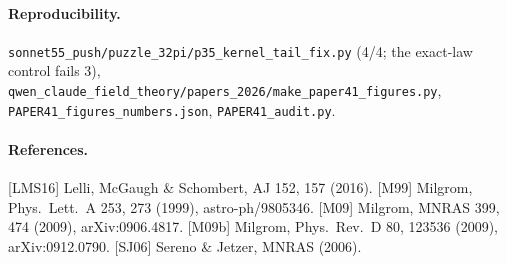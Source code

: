 \documentclass[10pt]{article}
\newcommand{\fpath}[1]{\nolinkurl{#1}}
\begin{document}
\paragraph{Reproducibility.} \fpath{sonnet55_push/puzzle_32pi/p35_kernel_tail_fix.py} (4/4; the exact-law control fails 3), \fpath{qwen_claude_field_theory/papers_2026/make_paper41_figures.py}, \fpath{PAPER41_figures_numbers.json}, \fpath{PAPER41_audit.py}.

\small
\paragraph{References.}
[LMS16] Lelli, McGaugh \& Schombert, AJ 152, 157 (2016).
[M99] Milgrom, Phys.\ Lett.\ A 253, 273 (1999), astro-ph/9805346.
[M09] Milgrom, MNRAS 399, 474 (2009), arXiv:0906.4817.
[M09b] Milgrom, Phys.\ Rev.\ D 80, 123536 (2009), arXiv:0912.0790.
[SJ06] Sereno \& Jetzer, MNRAS (2006).
\end{document}
